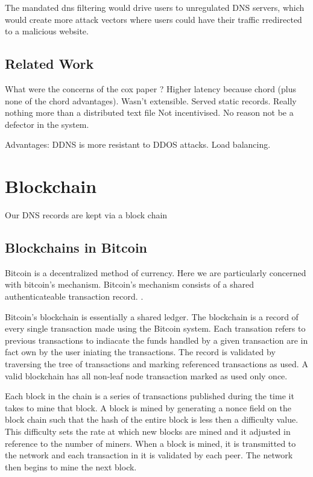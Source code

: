 \documentclass[11pt]{IEEEtran} %
\begin{document}
The mandated dns filtering would drive users to unregulated DNS servers, which would create more attack vectors where users could have their traffic rredirected to a malicious website. 

\subsection{Related Work}
What were the concerns of the cox paper \cite{cox}?  
Higher latency because chord (plus none of the chord advantages). 
Wasn't extensible.  Served static records.  Really nothing more than a distributed text file
Not incentivised. No reason not be a defector in the system.

Advantages:  DDNS is more resistant to DDOS attacks.  Load balancing.


\section{Blockchain}
Our DNS records are kept via a block chain

\subsection{Blockchains in Bitcoin}
Bitcoin is a decentralized method of currency. Here we are particularly concerned with bitcoin's mechanism. Bitcoin's mechanism consists of a shared authenticateable transaction record.  \cite{bitcoin} \cite{namecoin}.

Bitcoin's blockchain is essentially a shared ledger.  The blockchain is a record of every single transaction made using the Bitcoin system. Each transation refers to previous transactions to indiacate the funds handled by a given transaction are in fact own by the user iniating the transactions. The record is validated by traversing the tree of transactions and marking referenced transactions as used. A valid blockchain has all non-leaf node transaction marked as used only once.

Each block in the chain is a series of transactions published during the time it takes to mine that block. A block is mined by generating a nonce field on the block chain such that the hash of the entire block is less then a difficulty value. This difficulty sets the rate at which new blocks are mined and it adjusted in reference to the number of miners. When a block is mined, it is transmitted to the network and each transaction in it is validated by each peer. The network then begins to mine the next block.
\end{document}
